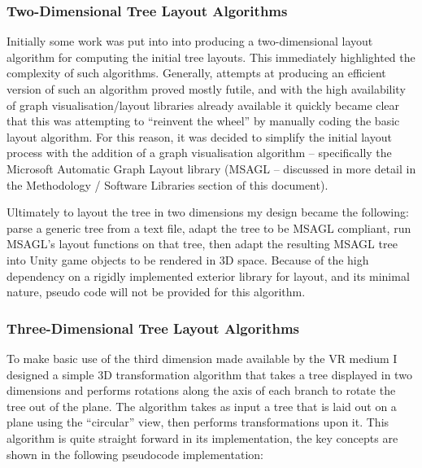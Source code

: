 \documentclass[10pt,letterpaper]{article}
\begin{document}
\subsubsection * {Two-Dimensional Tree Layout Algorithms}
Initially some work was put into into producing a two-dimensional layout algorithm for computing the initial tree layouts. This immediately highlighted the complexity of such algorithms. Generally, attempts at producing an efficient version of such an algorithm proved mostly futile, and with the high availability of graph visualisation/layout libraries already available it quickly became clear that this was attempting to “reinvent the wheel” by manually coding the basic layout algorithm. For this reason, it was decided to simplify the initial layout process with the addition of a graph visualisation algorithm – specifically the Microsoft Automatic Graph Layout library (MSAGL – discussed in more detail in the Methodology / Software Libraries section of this document). 

Ultimately to layout the tree in two dimensions my design became the following: parse a generic tree from a text file, adapt the tree to be MSAGL compliant, run MSAGL’s layout functions on that tree, then adapt the resulting MSAGL tree into Unity game objects to be rendered in 3D space.
Because of the high dependency on a rigidly implemented exterior library for layout, and its minimal nature, pseudo code will not be provided for this algorithm.

\subsubsection * {Three-Dimensional Tree Layout Algorithms}
To make basic use of the third dimension made available by the VR medium I designed a simple 3D transformation algorithm that takes a tree displayed in two dimensions and performs rotations along the axis of each branch to rotate the tree out of the plane. The algorithm takes as input a tree that is laid out on a plane using the “circular” view, then performs transformations upon it. This algorithm is quite straight forward in its implementation, the key concepts are shown in the following pseudocode implementation: 
\end{document}
